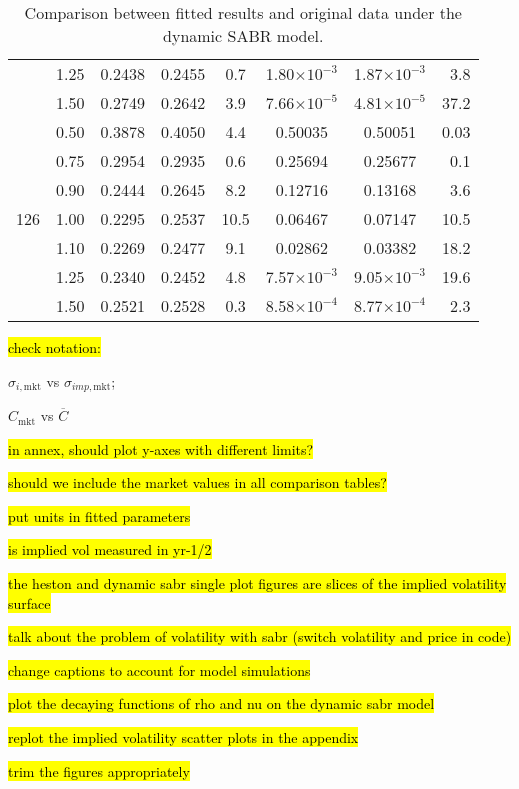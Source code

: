 \begin{table}[H]
\begin{tabular}{@{}lccccccr@{}}
 & 1.25 & 0.2438 & 0.2455 & 0.7 & 1.80$\times10^{-3}$ & 1.87$\times10^{-3}$ & 3.8 \\
 & 1.50 & 0.2749 & 0.2642 & 3.9 & 7.66$\times10^{-5}$ & 4.81$\times10^{-5}$ & 37.2 \\\midrule
\multirow{7}{*}{126} & 0.50 & 0.3878 & 0.4050 & 4.4 & 0.50035 & 0.50051 & 0.03 \\
 & 0.75 & 0.2954 & 0.2935 & 0.6 & 0.25694 & 0.25677 & 0.1 \\
 & 0.90 & 0.2444 & 0.2645 & 8.2 & 0.12716 & 0.13168 & 3.6 \\
 & 1.00 & 0.2295 & 0.2537 & 10.5 & 0.06467 & 0.07147 & 10.5 \\
 & 1.10 & 0.2269 & 0.2477 & 9.1 & 0.02862 & 0.03382 & 18.2 \\
 & 1.25 & 0.2340 & 0.2452 & 4.8 & 7.57$\times10^{-3}$ & 9.05$\times10^{-3}$ & 19.6 \\
 & 1.50 & 0.2521 & 0.2528 & 0.3 & 8.58$\times10^{-4}$ & 8.77$\times10^{-4}$ & 2.3 \\
 \bottomrule
\end{tabular}
  \caption[Comparison between fitted results and original data under the dynamic SABR model.]{Comparison between fitted results and original data under the dynamic SABR model.}
  \label{tab:DS}
\end{table}



\newpage


\hl{check notation:}

$\sigma_{i,\mathrm{mkt}}$ vs $\sigma_{imp,\mathrm{mkt}}$;

$C_{\mathrm{mkt}}$ vs $\overline{C}$


\hl{in annex, should plot y-axes with different limits?}

\hl{should we include the market values in all comparison tables?}

\hl{put units in fitted parameters}

\hl{is implied vol measured in yr-1/2}

\hl{the heston and dynamic sabr single plot figures are slices of the implied volatility surface}

\hl{talk about the problem of volatility with sabr (switch volatility and price in code)}


\hl{change captions to account for model simulations}

\hl{plot the decaying functions of rho and nu on the dynamic sabr model}

\hl{replot the implied volatility scatter plots in the appendix}

\hl{trim the figures appropriately}